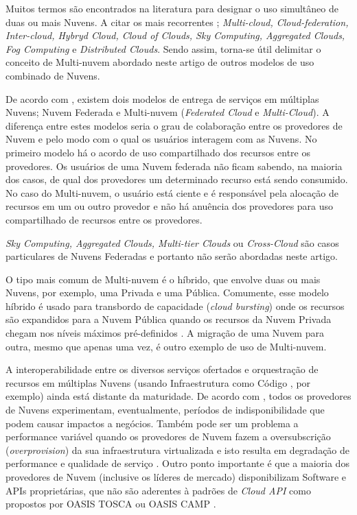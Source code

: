 \documentclass[12pt]{article}
\begin{document}
	Muitos termos são encontrados na literatura para designar o uso simultâneo de duas ou mais Nuvens. A citar os mais recorrentes \cite{Ferrer:2012}; \textit{Multi-cloud, Cloud-federation, Inter-cloud, Hybryd Cloud, Cloud of Clouds, Sky Computing, Aggregated Clouds, Fog Computing} e \textit{Distributed Clouds}. Sendo assim, torna-se útil delimitar o conceito de Multi-nuvem abordado neste artigo de outros modelos de uso combinado de Nuvens.
	
	De acordo com \cite{Ferrer:2012}, existem dois modelos de entrega de serviços em múltiplas Nuvens; Nuvem Federada e Multi-nuvem (\textit{Federated Cloud} e \textit{Multi-Cloud}). A diferença entre estes modelos seria o grau de colaboração entre os provedores de Nuvem e pelo modo com o qual os usuários interagem com as Nuvens. No primeiro modelo há o acordo de uso compartilhado dos recursos entre os provedores. Os usuários de uma Nuvem federada não ficam sabendo, na maioria dos casos, de qual dos provedores um determinado recurso está sendo consumido. No caso do Multi-nuvem, o usuário está ciente e é responsável pela alocação de recursos em um ou outro provedor e não há anuência dos provedores para uso compartilhado de recursos entre os provedores.
	
	\textit{Sky Computing, Aggregated Clouds, Multi-tier Clouds} ou \textit{Cross-Cloud} são casos particulares de Nuvens Federadas e portanto não serão abordadas neste artigo. 
	
	O tipo mais comum de Multi-nuvem é o híbrido, que envolve duas ou mais Nuvens, por exemplo, uma Privada e uma Pública. Comumente, esse modelo híbrido é usado para transbordo de capacidade (\textit{cloud bursting}) onde os recursos são expandidos para a Nuvem Pública quando os recursos da Nuvem Privada chegam nos níveis máximos pré-definidos \cite{Ferrer:2012}. A migração de uma Nuvem para outra, mesmo que apenas uma vez, é outro exemplo de uso de Multi-nuvem.
	
	A interoperabilidade entre os diversos serviços ofertados e orquestração de recursos em múltiplas Nuvens (usando Infraestrutura como Código \cite{Morris:2016}, por exemplo) ainda está distante da maturidade. De acordo com \cite{Fisher:2018}, todos os provedores de Nuvens experimentam, eventualmente, períodos de indisponibilidade que podem causar impactos a negócios. Também pode ser um problema a performance variável quando os provedores de Nuvem fazem a oversubscrição (\textit{overprovision}) da sua infraestrutura virtualizada e isto resulta em degradação de performance e qualidade de serviço \cite{CloudSpectator:2017}. Outro ponto importante é que a maioria dos provedores de Nuvem  (inclusive os líderes de mercado) disponibilizam Software e APIs proprietárias, que não são aderentes à padrões de \textit{Cloud API} como propostos por OASIS TOSCA \cite{TOSCA:2019} ou OASIS CAMP \cite{CAMP:2019}.
	
\end{document}
